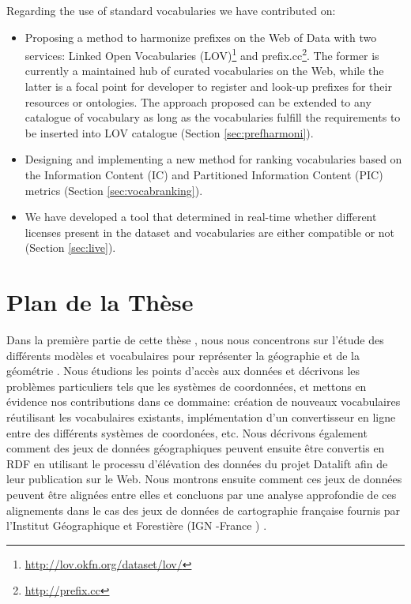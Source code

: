 \documentclass[a4paper,11pt,twoside]{report}
\begin{document}
Regarding the use of standard vocabularies we have contributed on: 
\begin{itemize}

\item  Proposing a method to harmonize prefixes on the Web of Data  with two services: Linked Open Vocabularies (LOV)\footnote{\url{http://lov.okfn.org/dataset/lov/}} and prefix.cc\footnote{\url{http://prefix.cc}}. The former is currently a maintained hub of curated vocabularies on the Web, while the latter is a focal point for developer to register and look-up prefixes for their resources or ontologies. The approach proposed can be extended to any catalogue of vocabulary as long as the vocabularies fulfill the requirements to be inserted into LOV catalogue (Section \ref{sec:prefharmoni}). 

\item  Designing and implementing a new method for ranking vocabularies based on the Information Content (IC) and Partitioned Information Content (PIC) metrics (Section \ref{sec:vocabranking}).

\item We have developed a tool that determined in real-time whether different licenses present in the dataset and vocabularies are either compatible or not (Section \ref{sec:live}). 
\end{itemize}

\chapter*{Plan de la Thèse} 
\label{sec:thesis-structure}

Dans la première partie de cette thèse , nous nous concentrons sur l'étude des différents modèles et vocabulaires pour représenter la géographie et de la géométrie . Nous étudions les points d'accès aux données et décrivons les problèmes particuliers tels que les systèmes de coordonnées, et mettons en évidence nos contributions dans ce dommaine: création de nouveaux vocabulaires réutilisant les vocabulaires existants, implémentation d'un convertisseur en ligne entre des différents systèmes de coordonées, etc. Nous décrivons également comment des jeux de données géographiques peuvent ensuite être convertis en RDF en utilisant le processu d'élévation des données du projet Datalift afin de leur publication sur le Web. Nous montrons ensuite comment ces jeux de données peuvent être alignées entre elles et concluons par une analyse approfondie de ces alignements dans le cas des jeux de données de cartographie française fournis par l'Institut Géographique et Forestière (IGN -France ) . 
\end{document}
